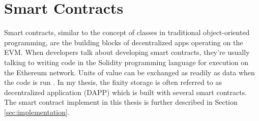 \section{Smart Contracts}
Smart contracts, similar to the concept of classes in traditional object-oriented programming, are the building blocks of decentralized apps operating on the EVM. When developers talk about developing smart contracts, they're usually talking to writing code in the Solidity programming language for execution on the Ethereum network. Units of value can be exchanged as readily as data when the code is run \cite[10]{dannen2017introducing}.
In my thesis, the fixity storage is often referred to as decentralized application (DAPP) which is built with several smart contracts. The smart contract implement in this thesis is further described in Section \ref{sec:implementation}. 


